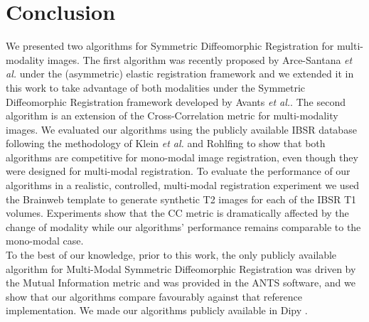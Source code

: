 \section{Conclusion}
We presented two algorithms for Symmetric Diffeomorphic Registration for multi-modality images. The first algorithm was recently proposed by Arce-Santana {\it et al.}
\cite{Arce-santana2014} under the (asymmetric) elastic registration framework and we extended it in this work to take advantage of both modalities under the
Symmetric Diffeomorphic Registration framework developed by Avants {\it et al.}. The second algorithm is an extension of the Cross-Correlation metric for multi-modality
images. We evaluated our algorithms using the publicly available IBSR database following the methodology of Klein {\it et al.} \cite{Klein2009}\cite{Klein2010} and
Rohlfing \cite{Rohlfing2012} to show that both algorithms are competitive for mono-modal image registration, even though they were designed for multi-modal registration.
To evaluate the performance of our algorithms in a realistic, controlled, multi-modal registration experiment we used the Brainweb\cite{Cocosco1997}\cite{Kwan1999} template
to generate synthetic T2 images for each of the IBSR T1 volumes. Experiments show that the CC metric is dramatically affected by the change of modality while our algorithms'
performance remains comparable to the mono-modal case.\\

To the best of our knowledge, prior to this work, the only publicly available algorithm for Multi-Modal Symmetric Diffeomorphic Registration was driven by the Mutual Information
metric and was provided in the ANTS software, and we show that our algorithms compare favourably against that reference implementation. We made our algorithms
publicly available in Dipy \cite{Garyfallidis2014}.
